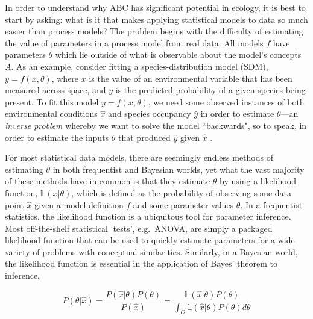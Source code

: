 \documentclass[]{article}
\begin{document}
In order to understand why ABC has significant potential in ecology, it
is best to start by asking: what is it that makes applying statistical
models to data so much easier than process models? The problem begins
with the difficulty of estimating the value of parameters in a process
model from real data. All models \(f\) have parameters \(\theta\) which
lie outside of what is observable about the model's concepts \(A\). As
an example, consider fitting a species-distribution model (SDM),
\(y = f(x, \theta)\), where \(x\) is the value of an environmental
variable that has been measured across space, and \(y\) is the predicted
probability of a given species being present. To fit this model
\(y =f(x, \theta)\), we need some observed instances of both
environmental conditions \(\hat{x}\) and species occupancy \(\hat{y}\)
in order to estimate \(\theta\)---an \textit{inverse problem} whereby we want
to solve the model ``backwards", so to speak, in order to estimate the
inputs \(\theta\) that produced \(\hat{y}\) given \(\hat{x}\)
\citep{stouffer_all_2019}.

For most statistical data models, there are seemingly endless methods of
estimating \(\theta\) in both frequentist and Bayesian worlds, yet what
the vast majority of these methods have in common is that they estimate
\(\theta\) by using a likelihood function, \(\mathbb{L}({x} | \theta)\),
which is defined as the probability of observing some data point
\(\hat{x}\) given a model definition \(f\) and some parameter values
\(\theta\). In a frequentist statistics, the likelihood function is a
ubiquitous tool for parameter inference. Most off-the-shelf statistical
`tests', e.g.~ANOVA, are simply a packaged likelihood function that can
be used to quickly estimate parameters for a wide variety of problems
with conceptual similarities. Similarly, in a Bayesian world, the
likelihood function is essential in the application of Bayes' theorem to
inference,

\[ P(\theta | \hat{x}) = \frac{P(\hat{x} | \theta)  P(\theta)}{P(\hat{x})} = \frac{\mathbb{L}(\hat{x}| \theta)  P(\theta)}{\int_\Theta \mathbb{L}(\hat{x} | \theta) P(\theta) d\theta}\]
\end{document}
